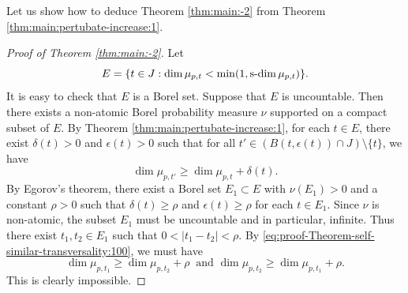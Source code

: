 \documentclass[a4paper,11pt]{amsart}
\theoremstyle{definition}
\newtheorem{remark}[theorem]{Remark}
\numberwithin{equation}{section}
\DeclareMathOperator{\sd}{{\rm{s}\textrm{-}\rm{dim}}}
\begin{document}
Let us show how to deduce Theorem \ref{thm:main:-2} from Theorem \ref{thm:main:pertubate-increase:1}.  
\begin{proof}[Proof of Theorem \ref{thm:main:-2}]
Let 
\[
E=\{t\in J: \dim \mu_{p,t}<\min (1,\sd \mu_{p,t})\}.
\]
It is easy to check that $E$ is a Borel set.  Suppose that $E$ is uncountable.  Then there exists a non-atomic Borel probability measure $\nu$ supported on a compact subset of $E$.  By Theorem \ref{thm:main:pertubate-increase:1}, for each $t\in E$, 
there exist $\delta(t)>0$ and $\epsilon(t)>0$ such that for all $t'\in \left(B(t,\epsilon(t))\cap J\right)\setminus \{t\}$, we have 
\begin{equation}\label{eq:proof-Theorem-self-similar-transversality:100}
\dim \mu_{p,t'} \ge \dim \mu_{p,t}+\delta(t).
\end{equation}
By Egorov's theorem,  there exist a Borel set $E_1\subset E$ with $\nu(E_1)>0$ and a constant $\rho>0$ such that $\delta(t)\ge \rho$ and $\epsilon(t)\ge \rho$ for each  $t\in E_1$.  Since $\nu$ is non-atomic,  the subset $E_1$ must be uncountable and in particular,  infinite.  Thus there exist $t_1,t_2\in E_1$ such that $0<|t_1-t_2|<\rho$.  By \eqref{eq:proof-Theorem-self-similar-transversality:100}, we must have
\[
\dim \mu_{p,t_1}\ge \dim \mu_{p,t_2}+\rho \ \textrm{ and } \dim \mu_{p,t_2}\ge \dim \mu_{p,t_1}+\rho.
\]
This is  clearly impossible.
\end{proof}

\end{document}
